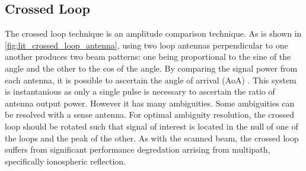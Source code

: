 \subsection{Crossed Loop}
The crossed loop technique is an amplitude comparison technique. As is shown in \autoref{fig:lit_crossed_loop_antenna}, using two loop antennas perpendicular to one another produces two beam patterns: one being proportional to the sine of the angle and the other to the cos of the angle. By comparing the signal power from each antenna, it is possible to ascertain the angle of arrival (AoA) . This system is instantanious as only a single pulse is necessary to ascertain the ratio of antenna output power. However it has many ambiguities. Some ambiguities can be resolved with a sense antenna. For optimal ambiguity resolution, the crossed loop should be rotated such that signal of interest is located in the null of one of the loops and the peak of the other.
As with the scanned beam, the crossed loop suffers from significant performance degredation arrising from multipath, specifically ionospheric reflection. 
